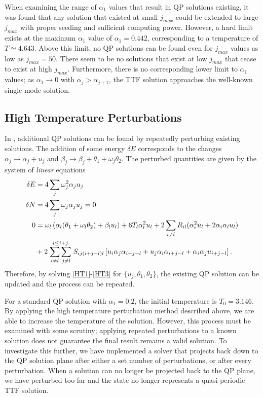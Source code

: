 \documentclass[../PhD.tex]{subfiles}
\begin{document}
When examining the range of $\alpha_1$ values that result in QP solutions existing, it was found that any solution that existed at small $j_{max}$ could be extended to large $j_{max}$ with proper seeding and sufficient computing power. However, a hard limit exists at the maximum $\alpha_1$ value of $\alpha_1=0.442$, corresponding to a temperature of $T \simeq 4.643$. Above this limit, no QP solutions can be found even for $j_{max}$ values as low as $j_{max}=50$. There seem to be no solutions that exist at low $j_{max}$ that cease to exist at high $j_{max}$. Furthermore, there is no corresponding lower limit to $\alpha_1$ values; as $\alpha_1 \to 0$ with $\alpha_j > \alpha_{j+1}$, the TTF solution approaches the well-known single-mode solution.


\subsection{High Temperature Perturbations}
\label{ssec: highT}

In \cite{1507.08261}, additional QP solutions can be found by repeatedly perturbing existing solutions. The addition of some energy $\delta E$ corresponds to the changes $\alpha_j \to \alpha_j + u_j$ and $\beta_j \to \beta_j + \theta_1 + \omega_j \theta_2$. The perturbed quantities are given by the system of \emph{linear} equations
\begin{align}
\label{HT1}
\delta E &= 4 \sum_j \omega^2_j \alpha_j u_j \\
\label{HT2}
\delta N &= 4 \sum_j \omega_j \alpha_j u_j = 0 \\
\label{HT3}
0 &= \omega_l \left( \alpha_l (\theta_1 + \omega_l \theta_2) +\beta_l u_l \right) + 6T_l \alpha_l^2 u_l + 2 \sum_{i \neq l} R_{il} (\alpha_i^2 u_l + 2 \alpha_i \alpha_l u_l ) \nonumber \\
& + 2 \stackrel{l \leq i + j}{\sum_{i \neq l} \sum_{j \neq l}} S_{ij(i+j-l)l} \left[ u_i \alpha_j \alpha_{i+j-l} + u_j \alpha_i \alpha_{i+j-l} + \alpha_i \alpha_j u_{i+j-l} \right].
\end{align}
Therefore, by solving \eqref{HT1}-\eqref{HT3} for $\{ u_j, \theta_1, \theta_2 \}$, the existing QP solution can be updated and the process can be repeated. 

For a standard QP solution with $\alpha_1 = 0.2$, the initial temperature is $T_0 = 3.146$. By applying the high temperature perturbation method described above, we are able to increase the temperature of the solution. However, this process must be examined with some scrutiny; applying repeated perturbations to a known solution does not guarantee the final result remains a valid solution. To investigate this further, we have implemented a solver that projects back down to the QP solution plane after either a set number of perturbations, or after every perturbation. When a solution can no longer be projected back to the QP plane, we have perturbed too far and the state no longer represents a quasi-periodic TTF solution.
\end{document}
